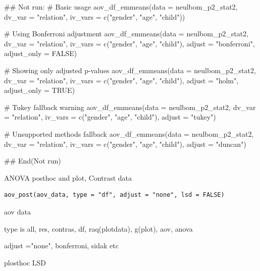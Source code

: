 \documentclass[a4paper]{book}
\begin{document}
\begin{Examples}
\begin{ExampleCode}
## Not run: 
# Basic usage
aov_df_emmeans(data = neulbom_p2_stat2,
               dv_var = "relation",
               iv_vars = c("gender", "age", "child"))

# Using Bonferroni adjustment
aov_df_emmeans(data = neulbom_p2_stat2,
               dv_var = "relation",
               iv_vars = c("gender", "age", "child"),
               adjust = "bonferroni", adjust_only = FALSE)

# Showing only adjusted p-values
aov_df_emmeans(data = neulbom_p2_stat2,
               dv_var = "relation",
               iv_vars = c("gender", "age", "child"),
               adjust = "holm", adjust_only = TRUE)

# Tukey fallback warning
aov_df_emmeans(data = neulbom_p2_stat2,
               dv_var = "relation",
               iv_vars = c("gender", "age", "child"),
               adjust = "tukey")

# Unsupported methods fallback
aov_df_emmeans(data = neulbom_p2_stat2,
               dv_var = "relation",
               iv_vars = c("gender", "age", "child"),
               adjust = "duncan")

## End(Not run)
\end{ExampleCode}
\end{Examples}
%
\begin{Description}
ANOVA posthoc and plot, Contrast data
\end{Description}
%
\begin{Usage}
\begin{verbatim}
aov_post(aov_data, type = "df", adjust = "none", lsd = FALSE)
\end{verbatim}
\end{Usage}
%
\begin{Arguments}
\begin{ldescription}
\item[\code{aov\_data}] aov data

\item[\code{type}] type is all, res, contras, df, raq(plotdata), g(plot), aov, anova

\item[\code{adjust}] adjust ="none", bonferroni, sidak etc

\item[\code{lsd}] plosthoc LSD
\end{ldescription}
\end{Arguments}
\end{document}
